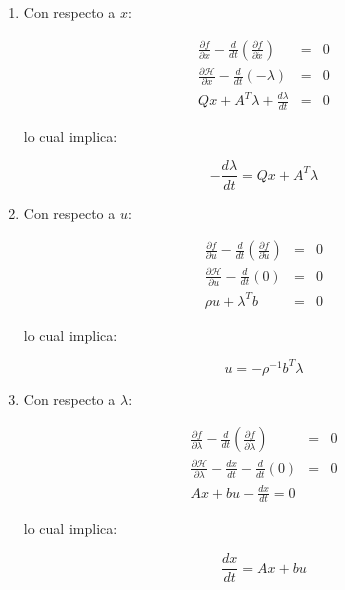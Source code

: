     \begin{enumerate}
        \item Con respecto a $x$:

        \begin{eqnarray*}
            \frac{\partial f}{\partial x} - \frac{d}{dt} \left( \frac{\partial f}{\partial \dot{x}} \right) & = & 0 \\
            \frac{\partial \mathscr{H}}{\partial x} - \frac{d}{dt} \left( -\lambda \right) & = & 0 \\
            Q x + A^T \lambda + \frac{d \lambda}{dt} & = & 0
        \end{eqnarray*}

        lo cual implica:

        \begin{equation} \label{eq:conop3}
            - \frac{d \lambda}{dt} = Q x + A^T \lambda
        \end{equation}

        \item Con respecto a $u$:

        \begin{eqnarray*}
            \frac{\partial f}{\partial u} - \frac{d}{dt} \left( \frac{\partial f}{\partial \dot{u}} \right)  & = & 0 \\
            \frac{\partial \mathscr{H}}{\partial u} - \frac{d}{dt} \left( 0 \right) & = & 0 \\
            \rho u + \lambda^T b & = & 0
        \end{eqnarray*}

        lo cual implica:

        \begin{equation} \label{eq:conop4}
            u = - \rho^{-1} b^T \lambda
        \end{equation}

        \item Con respecto a $\lambda$:

        \begin{eqnarray*}
            \frac{\partial f}{\partial \lambda} - \frac{d}{dt} \left( \frac{\partial f}{\partial \dot{\lambda}} \right) & = & 0 \\
            \frac{\partial \mathscr{H}}{\partial \lambda} - \frac{dx}{dt} - \frac{d}{dt} \left( 0 \right) & = & 0 \\
            A x + b u -\frac{dx}{dt} = 0
        \end{eqnarray*}

        lo cual implica:

        \begin{equation} \label{eq:conop5}
            \frac{dx}{dt} = A x + b u
        \end{equation}
    \end{enumerate}

